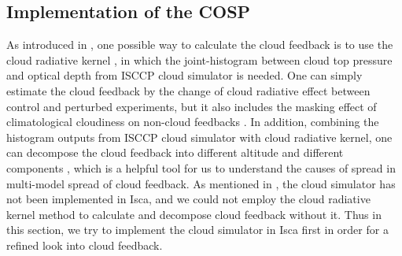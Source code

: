 \subsection{Implementation of the COSP}
As introduced in , one possible way to calculate the cloud feedback is to use the cloud radiative kernel \citep{Zelinka2012computing1,Zelinka2012computing2}, in which the joint-histogram between cloud top pressure and optical depth from ISCCP cloud simulator is needed. One can simply estimate the cloud feedback by the change of cloud radiative effect between control and perturbed experiments, but it also includes the masking effect of climatological cloudiness on non-cloud feedbacks \citep{Soden2004}. In addition, combining the histogram outputs from ISCCP cloud simulator with cloud radiative kernel, one can decompose the cloud feedback into  different altitude and different components \citep{Zelinka2012computing2,Zelinka2016insights}, which is a helpful tool for us to understand the causes of spread in multi-model spread of cloud feedback. As mentioned in , the cloud simulator has not been implemented in Isca, and we could not employ the cloud radiative kernel method to calculate and decompose cloud feedback without it. Thus in this section, we try to implement the cloud simulator in Isca first in order for a refined look into cloud feedback.



